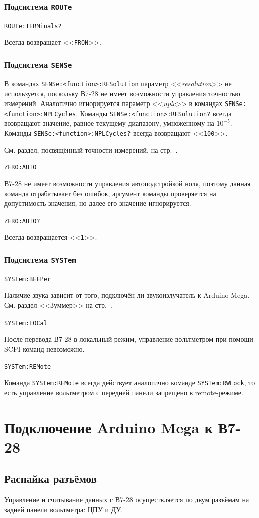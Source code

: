 \documentclass[12pt, a4paper]{article}
\newcommand{\V}{\mbox{В7-28}}
\newcommand{\Arduino}{Arduino Mega}
\newcommand{\CMD}[1]{{\tt #1}}
\newcommand{\PARAM}[1]{<<{\it #1}>>}
\newcommand{\RESPONSE}[1]{<<{\tt #1}>>}
\newcommand{\SUBSYSTEMSECTION}[1]{\subsubsection{Подсистема \CMD{#1}}}
\newcommand{\CMDSECTION}[1]{\CMD{#1}  }
\begin{document}
\SUBSYSTEMSECTION{ROUTe}

\CMDSECTION{ROUTe:TERMinals?}

Всегда возвращает \RESPONSE{FRON}.

\SUBSYSTEMSECTION{SENSe}

В командах \CMD{SENSe:<function>:RESolution} параметр \PARAM{resolution} не используется, поскольку \V{} не имеет возможности управления точностью измерений. Аналогично игнорируется параметр \PARAM{nplc} в командах \CMD{SENSe:<function>:NPLCycles}. Команды \CMD{SENSe:<function>:RESolution?} всегда возвращают значение, равное текущему диапазону, умноженному на $10^{-5}$. Команды \CMD{SENSe:<function>:NPLCycles?} всегда возвращают \RESPONSE{100}.

См. раздел, посвящённый точности измерений, на стр.~\pageref{sec_precision}.

\CMDSECTION{ZERO:AUTO}

\V{} не имеет возможности управления автоподстройкой ноля, поэтому данная команда отрабатывает без ошибок, аргумент команды проверяется на допустимость значения, но далее его значение игнорируется.

\CMDSECTION{ZERO:AUTO?}

Всегда возвращается \RESPONSE{1}.

\SUBSYSTEMSECTION{SYSTem}

\CMDSECTION{SYSTem:BEEPer}

Наличие звука зависит от того, подключён ли звукоизлучатель к \Arduino{}. См. раздел <<Зуммер>> на стр.~\pageref{sec_zummer}.

\CMDSECTION{SYSTem:LOCal}

После перевода \V{} в локальный режим, управление вольтметром при помощи SCPI команд невозможно.

\CMDSECTION{SYSTem:REMote}

Команда \CMD{SYSTem:REMote} всегда действует аналогично команде \CMD{SYSTem:RWLock}, то есть управление вольтметром с передней панели запрещено в remote-режиме.

\section{Подключение {\Arduino} к \V}

\subsection{Распайка разъёмов}

Управление и считывание данных с {\V} осуществляется по двум разъёмам на задней панели вольтметра: ЦПУ и ДУ.
\end{document}
